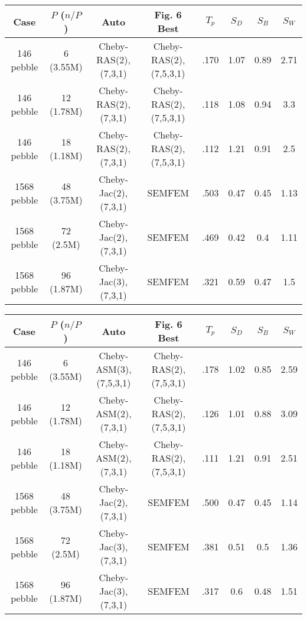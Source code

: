 \begin{table*}
\begin{subtable}{\textwidth}\centering
\begin{tabular}{||c|| c| c| c| c| c| c| c||}
  \hline
  Case & $P$ ($n/P$) & Auto & Fig. 6 Best & $T_p$ & $S_D$ & $S_B$ & $S_W$\\
  \hline\hline
  146 pebble  & 6  (3.55M) & Cheby-RAS(2),(7,3,1)  &  Cheby-RAS(2),(7,5,3,1)  & .170 & 1.07 & 0.89 & 2.71\\
  146 pebble  & 12 (1.78M) & Cheby-RAS(2),(7,3,1)  &  Cheby-RAS(2),(7,5,3,1)  & .118 & 1.08 & 0.94 & 3.3\\
  146 pebble  & 18 (1.18M) & Cheby-RAS(2),(7,3,1)  &  Cheby-RAS(2),(7,5,3,1)  & .112 & 1.21 & 0.91 & 2.5\\
  \hline
  1568 pebble & 48 (3.75M) & Cheby-Jac(2),(7,3,1)  &  SEMFEM                  & .503 & 0.47 & 0.45 & 1.13\\
  1568 pebble & 72 (2.5M)  & Cheby-Jac(2),(7,3,1)  &  SEMFEM                  & .469 & 0.42 & 0.4  & 1.11\\
  1568 pebble & 96 (1.87M) & Cheby-Jac(3),(7,3,1)  &  SEMFEM                  & .321 & 0.59 & 0.47 & 1.5\\
\hline
\end{tabular}
\caption{\small Projection used during evaluation at step 1000.\label{table:auto-tune-proj}}
\end{subtable}

\centering
\begin{subtable}{\textwidth}\centering
\begin{tabular}{||c|| c| c| c| c| c| c| c||}
  \hline
  Case & $P$ ($n/P$) & Auto & Fig. 6 Best & $T_p$ & $S_D$ & $S_B$ & $S_W$\\
  \hline\hline
  146 pebble  & 6  (3.55M) & Cheby-ASM(3),(7,5,3,1) & Cheby-RAS(2),(7,5,3,1)  & .178 & 1.02 & 0.85 & 2.59\\
  146 pebble  & 12 (1.78M) & Cheby-ASM(2),(7,3,1)   & Cheby-RAS(2),(7,5,3,1)  & .126 & 1.01 & 0.88 & 3.09\\
  146 pebble  & 18 (1.18M) & Cheby-ASM(2),(7,3,1)   & Cheby-RAS(2),(7,5,3,1)  & .111 & 1.21 & 0.91 & 2.51\\
  \hline
  1568 pebble & 48 (3.75M) & Cheby-Jac(2),(7,3,1)   & SEMFEM                  & .500 & 0.47 & 0.45 & 1.14\\
  1568 pebble & 72 (2.5M)  & Cheby-Jac(3),(7,3,1)   & SEMFEM                  & .381 & 0.51 & 0.5  & 1.36\\
  1568 pebble & 96 (1.87M) & Cheby-Jac(3),(7,3,1)   & SEMFEM                  & .317 & 0.6  & 0.48 & 1.51\\
\hline
\end{tabular}
\caption{\small (Single pass) evaluation done at 250, 500, and 1000 steps with solution projection.
The preconditioner with the lowest cost (\ref{eq:cost-model}) is chosen at step 1000.
\label{table:auto-multi-step-proj}}
\end{subtable}


\end{table*}
